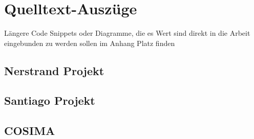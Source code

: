 
\chapter{Quelltext-Auszüge} %
\label{cha:quelltext_auszuege}

  Längere Code Snippets oder Diagramme, die es Wert sind direkt in die Arbeit eingebunden zu werden sollen im Anhang Platz finden
  
\section{Nerstrand Projekt} %
\label{sec:nerstrand_projekt}


\section{Santiago Projekt} %
\label{sec:santiago_projekt}




\section{COSIMA} %
\label{sec:cosima_architektur}


